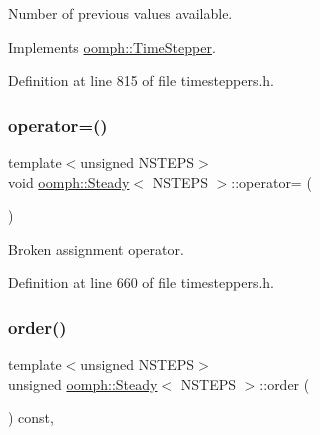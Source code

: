 Number of previous values available. 



Implements \hyperlink{classoomph_1_1TimeStepper_a0f38713ed304c18d9f7b5cf8131664c1}{oomph\+::\+Time\+Stepper}.



Definition at line 815 of file timesteppers.\+h.

\mbox{\label{classoomph_1_1Steady_a72bd55932539990df0c7b5db3a42926a}} 
\subsubsection{\texorpdfstring{operator=()}{operator=()}}
{\footnotesize\ttfamily template$<$unsigned N\+S\+T\+E\+PS$>$ \\
void \hyperlink{classoomph_1_1Steady}{oomph\+::\+Steady}$<$ N\+S\+T\+E\+PS $>$\+::operator= (\begin{DoxyParamCaption}\item[{const \hyperlink{classoomph_1_1Steady}{Steady}$<$ N\+S\+T\+E\+PS $>$ \&}]{ }\end{DoxyParamCaption})\hspace{0.3cm}{\ttfamily [inline]}}



Broken assignment operator. 



Definition at line 660 of file timesteppers.\+h.

\mbox{\label{classoomph_1_1Steady_ac1735b614e9adf73a889e37afdd6d3a2}} 
\subsubsection{\texorpdfstring{order()}{order()}}
{\footnotesize\ttfamily template$<$unsigned N\+S\+T\+E\+PS$>$ \\
unsigned \hyperlink{classoomph_1_1Steady}{oomph\+::\+Steady}$<$ N\+S\+T\+E\+PS $>$\+::order (\begin{DoxyParamCaption}{ }\end{DoxyParamCaption}) const\hspace{0.3cm}{\ttfamily [inline]}, {\ttfamily [virtual]}}



